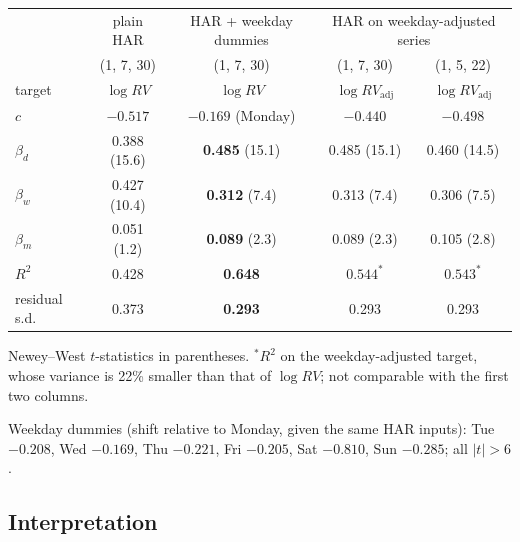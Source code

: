 \documentclass[11pt]{article}
\numberwithin{equation}{section}
\begin{document}
\begin{center}
\small
\begin{tabular}{lcccc}
\toprule
 & plain HAR & HAR + weekday dummies & \multicolumn{2}{c}{HAR on weekday-adjusted series} \\
 & (1, 7, 30) & (1, 7, 30) & (1, 7, 30) & (1, 5, 22) \\
target & $\log RV$ & $\log RV$ & $\log RV_{\text{adj}}$ & $\log RV_{\text{adj}}$ \\
\midrule
$c$ & $-0.517$ & $-0.169$ (Monday) & $-0.440$ & $-0.498$ \\
$\beta_d$ & 0.388 (15.6) & \textbf{0.485} (15.1) & 0.485 (15.1) & 0.460 (14.5) \\
$\beta_w$ & 0.427 (10.4) & \textbf{0.312} (7.4) & 0.313 (7.4) & 0.306 (7.5) \\
$\beta_m$ & 0.051 (1.2) & \textbf{0.089} (2.3) & 0.089 (2.3) & 0.105 (2.8) \\
\midrule
$R^2$ & 0.428 & \textbf{0.648} & $0.544^{*}$ & $0.543^{*}$ \\
residual s.d. & 0.373 & \textbf{0.293} & 0.293 & 0.293 \\
\bottomrule
\end{tabular}
\end{center}
\noindent Newey--West $t$-statistics in parentheses. $^{*}R^2$ on the weekday-adjusted target, whose variance is 22\% smaller than that of $\log RV$; not comparable with the first two columns.

\noindent Weekday dummies (shift relative to Monday, given the same HAR inputs): Tue $-0.208$, Wed $-0.169$, Thu $-0.221$, Fri $-0.205$, Sat $-0.810$, Sun $-0.285$; all $|t| > 6$.

\subsection{Interpretation}
\end{document}
